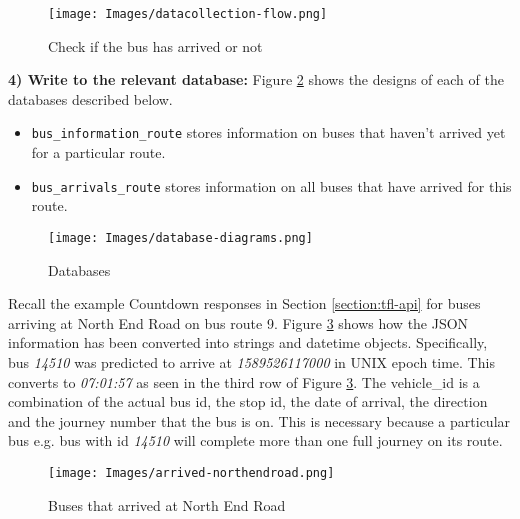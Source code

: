 \begin{figure}[H]
\begin{center}
    \texttt{[image: Images/datacollection-flow.png]}
    \caption{Check if the bus has arrived or not}
    \label{fig:check-if-bus-arrived}
\end{center}
\end{figure}

\textbf{4) Write to the relevant database:} Figure \ref{fig:databases} shows the designs of each of the databases described below.

\begin{itemize}
    \item \texttt{bus\_information\_route} stores information on buses that haven't arrived yet for a particular route.
    \item \texttt{bus\_arrivals\_route} stores information on all buses that have arrived for this route. 
\end{itemize}

\begin{figure}[H]
\begin{center}
    \texttt{[image: Images/database-diagrams.png]}
    \caption{Databases}
    \label{fig:databases}
\end{center}
\end{figure}

Recall the example Countdown responses in Section \ref{section:tfl-api} for buses arriving at North End Road on bus route 9. Figure \ref{fig:arrived-database} shows how the JSON information has been converted into strings and datetime objects. Specifically, bus \textit{14510} was predicted to arrive at \textit{1589526117000} in UNIX epoch time. This converts to \textit{07:01:57} as seen in the third row of Figure \ref{fig:arrived-database}. The vehicle\_id is a combination of the actual bus id, the stop id, the date of arrival, the direction and the journey number that the bus is on. This is necessary because a particular bus e.g. bus with id \textit{14510} will complete more than one full journey on its route. \\

\begin{figure}[H]
\begin{center}
    \texttt{[image: Images/arrived-northendroad.png]}
    \caption{Buses that arrived at North End Road}
    \label{fig:arrived-database}
\end{center}
\end{figure}

